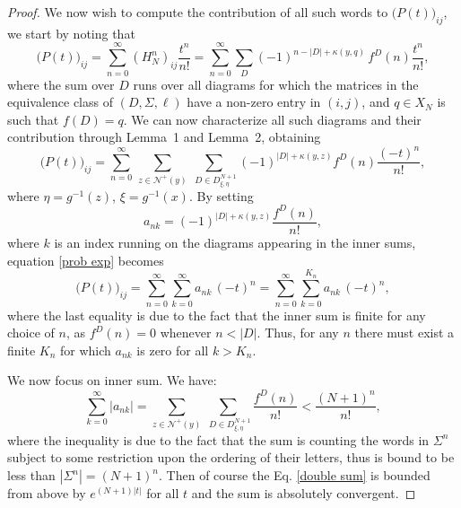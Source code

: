\documentclass{article}
\begin{document}
\begin{proof}
    We now wish to compute the contribution of all such words to $\big( P(t)\big)_{ij}$, we start by noting that
    \begin{equation*}
        \big(P(t)\big)_{ij}=\sum_{n=0}^\infty \left(H^n_N\right)_{ij} \frac{t^n}{n!}=\sum_{n=0}^\infty\sum_D(-1)^{n-|D|+\kappa(y,q)}\,f^D(n)\frac{t^n}{n!},
    \end{equation*}
    where the sum over $D$ runs over all diagrams for which the matrices in the equivalence class of $(D,\Sigma,\ell)$ have a non-zero entry in $(i,j)$, and $q\in X_N$ is such that $f(D)=q$. We can now characterize all such diagrams and their contribution through Lemma~1 and Lemma~2, obtaining
    \begin{equation}
        \label{prob exp}
        \big(P(t)\big)_{ij}=\sum_{n=0}^\infty\,\sum_{z\in\mathcal{N}^+(y)}\sum_{\ \,  D\in D^{N+1}_{\xi,\eta}}(-1)^{|D|+\kappa(y,z)}f^D(n)\frac{(-t)^n}{n!},
    \end{equation}
    where $\eta=g^{-1}(z)$, $\xi=g^{-1}(x)$. By setting
    \begin{equation*}
        a_{nk}=(-1)^{|D|+\kappa(y,z)}\frac{f^D(n)}{n!},
    \end{equation*}
    where $k$ is an index running on the diagrams appearing in the inner sums, equation \eqref{prob exp} becomes
    \begin{equation}
        \label{double sum}
        \big(P(t)\big)_{ij}=\sum_{n=0}^{\infty}\sum_{k=0}^{\infty} a_{nk}\,(-t)^n=\sum_{n=0}^{\infty}\sum_{k=0}^{K_n} a_{nk}\,(-t)^n,
    \end{equation}
    where the last equality is due to the fact that the inner sum is finite for any choice of $n$, as $f^{D}(n)=0$ whenever $n<|D|$. Thus, for any $n$ there must exist a finite $K_n$ for which $a_{nk}$ is zero for all $k>K_n$.
    
    We now focus on inner sum. We have:
    \begin{equation*}
        \sum_{k=0}^{\infty} |a_{nk}|=\sum_{z\in\mathcal{N}^+(y)}\sum_{\ \,  D\in D^{N+1}_{\xi,\eta}}\frac{f^D(n)}{n!}<\frac{(N+1)^n}{n!},
    \end{equation*}
    where the inequality is due to the fact that the sum is counting the words in $\Sigma^n$ subject to some restriction upon the ordering of their letters, thus is bound to be less than $|\Sigma^n|=(N+1)^n$. Then of course the Eq. \eqref{double sum} is bounded from above by 	$e^{(N+1)|t|}$ for all $t$ and the sum is absolutely convergent.
    

\end{proof}
\end{document}
